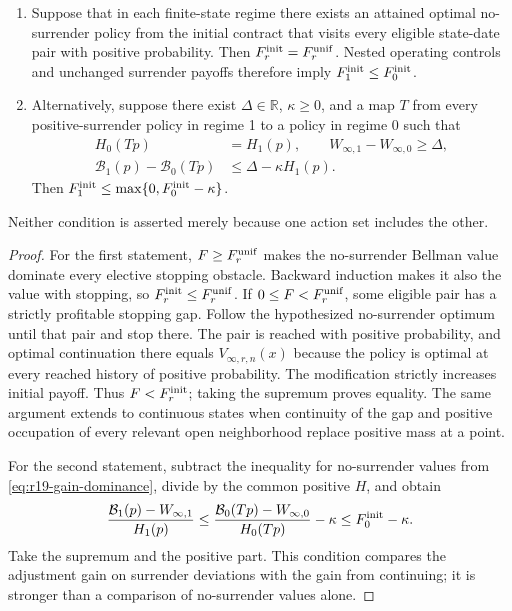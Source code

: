 \begin{proposition}
\label{prop:r19-initial-order}
\begin{enumerate}
\item Suppose that in each finite-state regime there exists an attained optimal no-surrender policy from the initial contract that visits every eligible state-date pair with positive probability. Then $F^{\rm init}_r=F^{\rm unif}_r$. Nested operating controls and unchanged surrender payoffs therefore imply $F^{\rm init}_1\leq F^{\rm init}_0$.
\item Alternatively, suppose there exist $\Delta\in\mathbb R$, $\kappa\geq0$, and a map $T$ from every positive-surrender policy in regime 1 to a policy in regime 0 such that
\begin{align}
 H_0(Tp)&=H_1(p),\qquad W_{\infty,1}-W_{\infty,0}\geq\Delta,\\
 \mathcal B_1(p)-\mathcal B_0(Tp)&\leq\Delta-\kappa H_1(p).
 \label{eq:r19-gain-dominance}
\end{align}
Then $F^{\rm init}_1\leq\max\{0,F^{\rm init}_0-\kappa\}$.
\end{enumerate}
Neither condition is asserted merely because one action set includes the other.
\end{proposition}
\begin{proof}
For the first statement, $F\geq F^{\rm unif}_r$ makes the no-surrender Bellman value dominate every elective stopping obstacle. Backward induction makes it also the value with stopping, so $F^{\rm init}_r\leq F^{\rm unif}_r$. If $0\leq F<F^{\rm unif}_r$, some eligible pair has a strictly profitable stopping gap. Follow the hypothesized no-surrender optimum until that pair and stop there. The pair is reached with positive probability, and optimal continuation there equals $V_{\infty,r,n}(x)$ because the policy is optimal at every reached history of positive probability. The modification strictly increases initial payoff. Thus $F<F^{\rm init}_r$; taking the supremum proves equality. The same argument extends to continuous states when continuity of the gap and positive occupation of every relevant open neighborhood replace positive mass at a point.

For the second statement, subtract the inequality for no-surrender values from \eqref{eq:r19-gain-dominance}, divide by the common positive $H$, and obtain
\[
 \frac{\mathcal B_1(p)-W_{\infty,1}}{H_1(p)}
 \leq \frac{\mathcal B_0(Tp)-W_{\infty,0}}{H_0(Tp)}-\kappa
 \leq F^{\rm init}_0-\kappa.
\]
Take the supremum and the positive part. This condition compares the adjustment gain on surrender deviations with the gain from continuing; it is stronger than a comparison of no-surrender values alone.
\end{proof}

